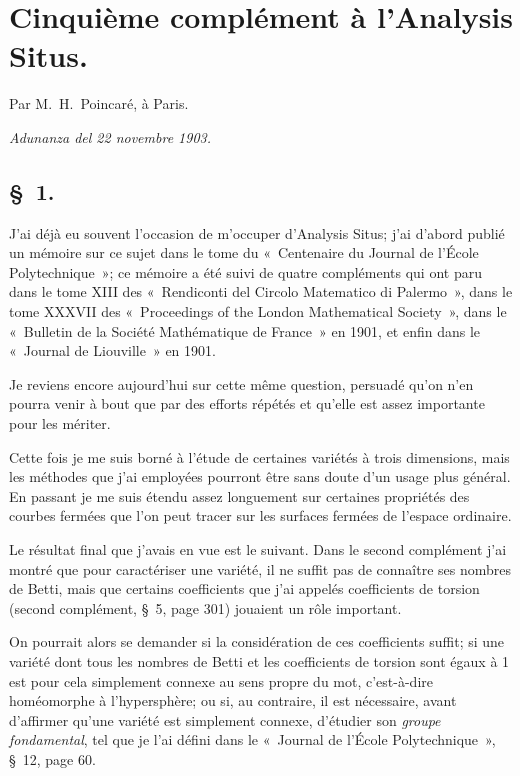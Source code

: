 \documentclass{article}
\begin{document}
\section*{Cinquième complément à l'Analysis Situs.}

Par M.~H.~Poincaré, à Paris.

\emph{Adunanza del 22 novembre 1903.}

\subsection*{\S~1.}

J'ai déjà eu souvent l'occasion de m'occuper d'Analysis Situs; j'ai d'abord publié un mémoire sur ce sujet dans le tome du «~Centenaire du Journal de l'École Polytechnique~»; ce mémoire a été suivi de quatre compléments qui ont paru dans le tome XIII des «~Rendiconti del Circolo Matematico di Palermo~», dans le tome XXXVII des «~Proceedings of the London Mathematical Society~», dans le «~Bulletin de la Société Mathématique de France~» en 1901, et enfin dans le «~Journal de Liouville~» en 1901.

Je reviens encore aujourd'hui sur cette même question, persuadé qu'on n'en pourra venir à bout que par des efforts répétés et qu'elle est assez importante pour les mériter.

Cette fois je me suis borné à l'étude de certaines variétés à trois dimensions, mais les méthodes que j'ai employées pourront être sans doute d'un usage plus général. En passant je me suis étendu assez longuement sur certaines propriétés des courbes fermées que l'on peut tracer sur les surfaces fermées de l'espace ordinaire.

Le résultat final que j'avais en vue est le suivant. Dans le second complément j'ai montré que pour caractériser une variété, il ne suffit pas de connaître ses nombres de Betti, mais que certains coefficients que j'ai appelés coefficients de torsion (second complément, \S~5, page 301) jouaient un rôle important.


On pourrait alors se demander si la considération de ces coefficients suffit; si une variété dont tous les nombres de Betti et les coefficients de torsion sont égaux à 1 est pour cela simplement connexe au sens propre du mot, c'est-à-dire homéomorphe à l'hypersphère; ou si, au contraire, il est nécessaire, avant d'affirmer qu'une variété est simplement connexe, d'étudier son \emph{groupe fondamental}, tel que je l'ai défini dans le «~Journal de l'École Polytechnique~», \S~12, page 60.
\end{document}
